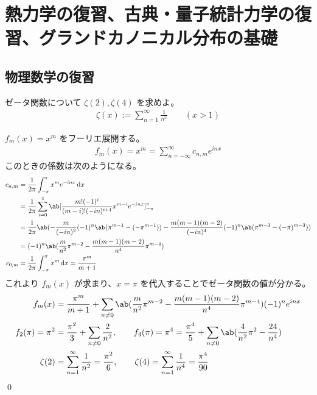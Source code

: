 \documentclass[uplatex,dvipdfmx,a4paper,11pt]{jlreq}
\title{}
\author{anko9801}
\makeatletter
\theoremstyle{definition}
\renewenvironment{proof}[1][\proofname]{\par
  \normalfont
  \topsep6\p@\@plus6\p@ \trivlist
  \item[\hskip\labelsep{\bfseries #1}\@addpunct{\bfseries}]\ignorespaces\quad\par
}{%
  \qed\endtrivlist\@endpefalse
}
\renewcommand\proofname{証明}
\makeatother
\begin{document}
\maketitle
\tableofcontents
\clearpage

\section{熱力学の復習、古典・量子統計力学の復習、グランドカノニカル分布の基礎}
\setcounter{subsection}{3}
\subsection{物理数学の復習}
\begin{problem}
ゼータ関数について $\zeta(2), \zeta(4)$ を求めよ。
\begin{align}
  \zeta(x) := \sum_{n=1}^{\infty}\frac{1}{n^x} \qquad (x > 1)
\end{align}
\end{problem}
\begin{proof}
  $f_m(x) = x^m$ をフーリエ展開する。
  \begin{align}
    f_m(x) = x^m = \sum_{n=-\infty}^{\infty}c_{n,m}e^{inx}
  \end{align}
  このときの係数は次のようになる。
  \begin{align}
    c_{n,m} & = \frac{1}{2\pi}\int_{-\pi}^{\pi}x^me^{-inx}\dl{x}                                                                                              \\
            & = \frac{1}{2\pi}\sum_{i=0}^{4}\ab[\frac{m!(-1)^i}{(m-i)!(-in)^{i+1}}x^{m-i}e^{-inx}]_{-\pi}^{\pi}                                               \\
            & = \frac{1}{2\pi}\ab(-\frac{m}{(-in)^{2}}(-1)^n\ab(\pi^{m-1} - (-\pi^{m-1})) - \frac{m(m-1)(m-2)}{(-in)^{4}}(-1)^n\ab(\pi^{m-3} - (-\pi)^{m-3})) \\
            & = (-1)^n\ab(\frac{m}{n^2}\pi^{m-2} - \frac{m(m-1)(m-2)}{n^4}\pi^{m-4})                                                                          \\
    c_{0,m} & = \frac{1}{2\pi}\int_{-\pi}^\pi x^m\dl{x} = \frac{\pi^m}{m+1}
  \end{align}
  これより $f_m(x)$ が求まり、$x = \pi$ を代入することでゼータ関数の値が分かる。
  \begin{align}
    f_m(x)           & = \frac{\pi^m}{m+1} + \sum_{n\neq 0}\ab(\frac{m}{n^2}\pi^{m-2} - \frac{m(m-1)(m-2)}{n^4}\pi^{m-4})(-1)^ne^{inx}                                     \\
    f_2(\pi) = \pi^2 & = \frac{\pi^2}{3} + \sum_{n\neq 0}\frac{2}{n^2}, \qquad f_4(\pi) = \pi^4 = \frac{\pi^4}{5} + \sum_{n\neq 0}\ab(\frac{4}{n^2}\pi^2 - \frac{24}{n^4}) \\
    \zeta(2)         & = \sum_{n=1}^\infty\frac{1}{n^2} = \frac{\pi^2}{6}, \qquad \zeta(4) = \sum_{n=1}^\infty\frac{1}{n^4} = \frac{\pi^4}{90}
  \end{align}
\end{proof}
\end{document}
